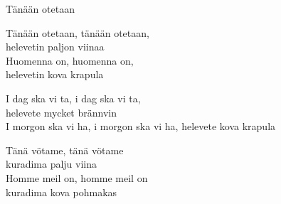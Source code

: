 \begin{song}{Tänään otetaan}

    Tänään otetaan, tänään otetaan,\\
    helevetin paljon viinaa\\
    Huomenna on, huomenna on,\\
    helevetin kova krapula

    I dag ska vi ta, i dag ska vi ta,\\
    helevete mycket brännvin\\
    I morgon ska vi ha, i morgon ska vi ha, helevete kova krapula

    Tänä vötame, tänä vötame\\
    kuradima palju viina\\
    Homme meil on, homme meil on\\
    kuradima kova pohmakas\\

\end{song}